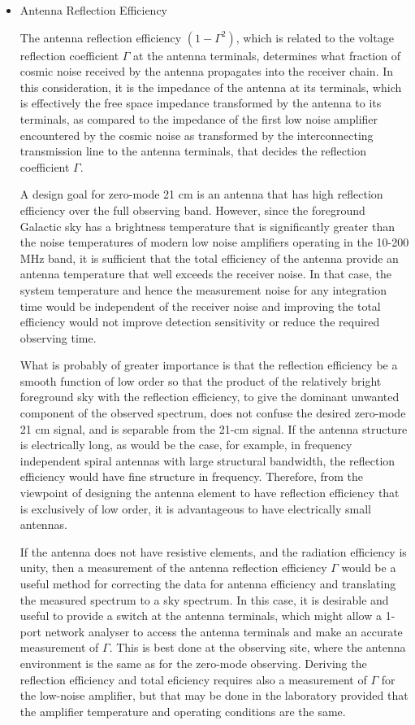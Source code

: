\begin{itemize}
   \item
   Antenna Reflection Efficiency
   
   The antenna reflection efficiency $(1-\Gamma^2)$, which is related to the voltage reflection coefficient $\Gamma$ at the antenna terminals, determines what fraction of cosmic noise received by the antenna propagates into the receiver chain.  In this consideration, it is the impedance of the antenna at its terminals, which is effectively the free space impedance transformed by the antenna to its terminals, as compared to the impedance of the first low noise amplifier encountered by the cosmic noise as transformed by the interconnecting transmission line to the antenna terminals, that decides the reflection coefficient $\Gamma$.  
   
   A design goal for zero-mode 21 cm is an antenna that has high reflection efficiency over the full observing band.  However, since the foreground Galactic sky has a brightness temperature that is significantly greater than the noise temperatures of modern low noise amplifiers operating in the 10-200 MHz band, it is sufficient that the total efficiency of the antenna provide an antenna temperature that well exceeds the receiver noise.  In that case, the system temperature and hence the measurement noise for any integration time would be independent of the receiver noise and improving the total efficiency would not improve detection sensitivity or reduce the required observing time.
   
   What is probably of greater importance is that the reflection efficiency be a smooth function of low order so that the product of the relatively bright foreground sky with the reflection efficiency, to give the dominant unwanted component of the observed spectrum, does not confuse the desired zero-mode 21 cm signal, and is separable from the 21-cm signal.  If the antenna structure is electrically long, as would be the case, for example, in frequency independent spiral antennas with large structural bandwidth, the reflection efficiency would have fine structure in frequency.  Therefore, from the viewpoint of designing the antenna element to have reflection efficiency that is exclusively of low order, it is advantageous to have electrically small antennas.
   
   If the antenna does not have resistive elements, and the radiation efficiency is unity, then a measurement of the antenna reflection efficiency $\Gamma$ would be a useful method for correcting the data for antenna efficiency and translating the measured spectrum to a sky spectrum. In this case, it is desirable and useful to provide a switch at the antenna terminals, which might allow a 1-port network analyser to access the antenna terminals and make an accurate measurement of $\Gamma$.  This is best done at the observing site, where the antenna environment is the same as for the zero-mode observing.  Deriving the reflection efficiency and total eficiency requires also a measurement of $\Gamma$ for the low-noise amplifier, but that may be done in the laboratory provided that the amplifier temperature and operating conditions are the same.
   

\end{itemize}
